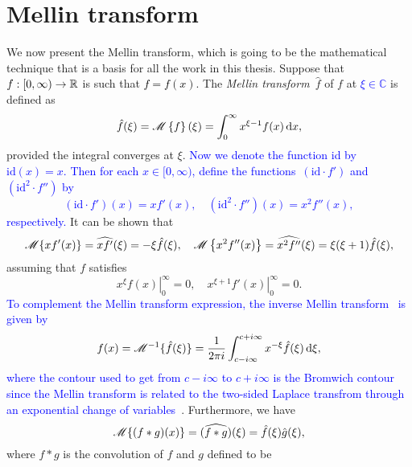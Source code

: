 \section{Mellin transform}
\label{subsec:mellin}
We now present the Mellin transform, which is going to be the mathematical technique that is a basis for all the work in this thesis. Suppose that $f : [0,\infty) \rightarrow \mathbb R$ is such that \textcolor{black}{$f = f(x)$}. The {\em Mellin transform}~$\hat f$ of $f$ at \textcolor{blue}{$\xi \in \mathbb{C}$} is defined as
\begin{equation*}
\hat f(\xi) =  \textcolor{black}{\mathscr M\left\{ f \right\}(\xi)} = \int_0^\infty x^{\xi - 1} f(x) \, \mathrm d x,
\end{equation*}
provided the integral converges at $\xi$. \textcolor{blue}{Now we denote the function id by $\text{id}(x) = x$. Then for each $x \in [0,\infty)$, define the functions~$(\text{id}\cdot f')$ and $(\text{id}^2 \cdot f'')$ by
\begin{equation*}
(\text{id}\cdot f')(x) = x f'(x), \quad (\text{id}^2\cdot f'')(x) = x^2 f''(x),
\end{equation*}
respectively.} It can be shown that \cite[pp. 362--363]{Myint1987}
\begin{equation}
\label{eqn:mellinDiv}
\mathscr M\{ xf'(x) \} = \widehat{x f'}(\xi) = -\xi \hat f(\xi), \quad \mathscr M\left\{ x^2f''(x) \right\} = \widehat{x^2 f''}(\xi) = \xi (\xi + 1) \hat f(\xi),
\end{equation}
assuming that $f$ satisfies
\begin{equation*}
\left. x^\xi f(x) \right\vert_0^\infty = 0, \quad \left. x^{\xi + 1} f'(x) \right\vert_0^\infty = 0.
\end{equation*}
\textcolor{blue}{To complement the Mellin transform expression, the inverse Mellin transform~\cite{Titchmarsh1948} is given by
\begin{equation*}
	f(x) = \mathscr M^{-1}\{\hat f(\xi)\} = \frac{1}{2\pi i} \int_{c-i\infty}^{c+i\infty} x^{-\xi}\hat f(\xi)  \, \mathrm d \xi,
\end{equation*}
where the contour used to get from $c - i\infty$ to $c + i\infty$ is the Bromwich contour since the Mellin transform is related to the two-sided Laplace transfrom through an exponential change of variables~\cite{Bracewell2000}}. Furthermore, we have
	\begin{equation*}
		\mathscr M\{ (f \ast g)(x) \} = (\widehat{f \ast g})(\xi) = \hat f(\xi) \hat g(\xi),
	\end{equation*}
where $f \ast g$ is the convolution of $f$ and $g$ defined to be
